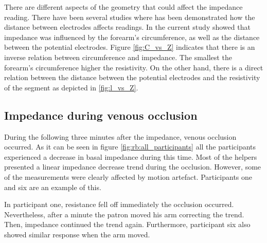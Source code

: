 There are different aspects of the geometry that could affect the impedance reading. There have been several studies where has been demonstrated how the distance between electrodes affects readings. In the current study showed that impedance was influenced by the forearm's circumference, as well as the distance between the potential electrodes. Figure \ref{fig:C_vs_Z} indicates that there is an inverse relation between circumference and impedance. The smallest the forearm's circumference higher the resistivity. On the other hand, there is a direct relation between the distance between the potential electrodes and the resistivity of the segment as depicted in \ref{fig:l_vs_Z}.



\subsection{Impedance during venous occlusion}
\label{section5.1.2}
During the following three minutes after the impedance, venous occlusion occurred. As it can be seen in figure \ref{fig:rb:all_participants} all the participants experienced a decrease in basal impedance during this time. Most of the helpers presented a linear impedance decrease trend during the occlusion. However, some of the measurements were clearly affected by motion artefact. Participants one and six are an example of this. 

In participant one, resistance fell off immediately the occlusion occurred. Nevertheless, after a minute the patron moved his arm correcting the trend. Then, impedance continued the trend again. Furthermore,  participant six also showed similar response when the arm moved. 

